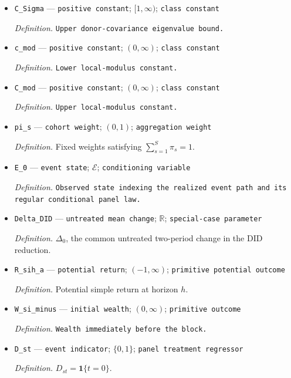\documentclass{article}
\begin{document}
\begin{itemize}
  \item \texttt{C\_\allowbreak{}Sigma} --- \texttt{positive constant}; \([1,\infty)\); \texttt{class constant}
  \par\smallskip\noindent\emph{Definition.} \texttt{Upper donor-\allowbreak{}covariance eigenvalue bound.}
  \item \texttt{c\_\allowbreak{}mod} --- \texttt{positive constant}; \((0,\infty)\); \texttt{class constant}
  \par\smallskip\noindent\emph{Definition.} \texttt{Lower local-\allowbreak{}modulus constant.}
  \item \texttt{C\_\allowbreak{}mod} --- \texttt{positive constant}; \((0,\infty)\); \texttt{class constant}
  \par\smallskip\noindent\emph{Definition.} \texttt{Upper local-\allowbreak{}modulus constant.}
  \item \texttt{pi\_\allowbreak{}s} --- \texttt{cohort weight}; \((0,1)\); \texttt{aggregation weight}
  \par\smallskip\noindent\emph{Definition.} Fixed weights satisfying \(\sum_{s=1}^{S}\pi_s=1\).
  \item \texttt{E\_\allowbreak{}0} --- \texttt{event state}; \(\mathcal E\); \texttt{conditioning variable}
  \par\smallskip\noindent\emph{Definition.} \texttt{Observed state indexing the realized event path and its regular conditional panel law.}
  \item \texttt{Delta\_\allowbreak{}DID} --- \texttt{untreated mean change}; \(\mathbb R\); \texttt{special-\allowbreak{}case parameter}
  \par\smallskip\noindent\emph{Definition.} \(\Delta_0\), the common untreated two-period change in the DID reduction.
  \item \texttt{R\_\allowbreak{}sih\_\allowbreak{}a} --- \texttt{potential return}; \((-1,\infty)\); \texttt{primitive potential outcome}
  \par\smallskip\noindent\emph{Definition.} Potential simple return at horizon \(h\).
  \item \texttt{W\_\allowbreak{}si\_\allowbreak{}minus} --- \texttt{initial wealth}; \((0,\infty)\); \texttt{primitive outcome}
  \par\smallskip\noindent\emph{Definition.} \texttt{Wealth immediately before the block.}
  \item \texttt{D\_\allowbreak{}st} --- \texttt{event indicator}; \(\{0,1\}\); \texttt{panel treatment regressor}
  \par\smallskip\noindent\emph{Definition.} \(D_{st}=\mathbf 1\{t=0\}\).

\end{itemize}
\end{document}
